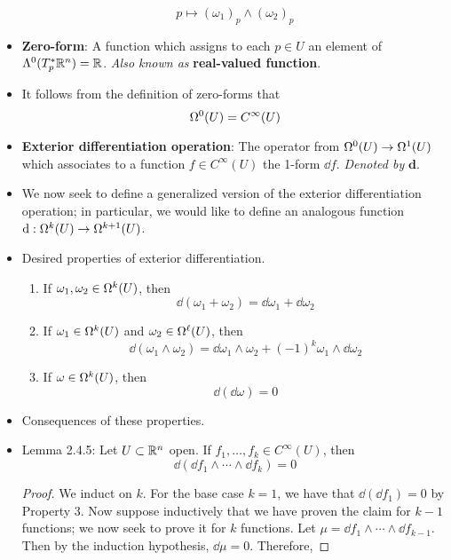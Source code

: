 \documentclass[../notes.tex]{subfiles}
\begin{document}
\begin{itemize}
\begin{equation*}
        p \mapsto (\omega_1)_p\wedge(\omega_2)_p
    \end{equation*}
    \item \textbf{Zero-form}: A function which assigns to each $p\in U$ an element of $\lam[0]{T_p^*\R^n}=\R$. \emph{Also known as} \textbf{real-valued function}.
    \item It follows from the definition of zero-forms that
    \begin{equation*}
        \ome[0]{U} = C^\infty(U)
    \end{equation*}
    \item \textbf{Exterior differentiation operation}: The operator from $\ome[0]{U}\to\ome[1]{U}$ which associates to a function $f\in C^\infty(U)$ the 1-form $\dd f$. \emph{Denoted by} $\mathbf{d}$.
    \item We now seek to define a generalized version of the exterior differentiation operation; in particular, we would like to define an analogous function $\dd:\ome[k]{U}\to\ome[k+1]{U}$.
    \item Desired properties of exterior differentiation.
    \begin{enumerate}
        \item If $\omega_1,\omega_2\in\ome[k]{U}$, then
        \begin{equation*}
            \dd(\omega_1+\omega_2) = \dd\omega_1+\dd\omega_2
        \end{equation*}
        \item If $\omega_1\in\ome[k]{U}$ and $\omega_2\in\ome[\ell]{U}$, then
        \begin{equation*}
            \dd(\omega_1\wedge\omega_2) = \dd\omega_1\wedge\omega_2+(-1)^k\omega_1\wedge\dd\omega_2
        \end{equation*}
        \item If $\omega\in\ome[k]{U}$, then
        \begin{equation*}
            \dd(\dd\omega) = 0
        \end{equation*}
    \end{enumerate}
    \item Consequences of these properties.
    \item Lemma 2.4.5: Let $U\subset\R^n$ open. If $f_1,\dots,f_k\in C^\infty(U)$, then
    \begin{equation*}
        \dd(\dd f_1\wedge\cdots\wedge\dd f_k) = 0
    \end{equation*}
    \begin{proof}
        We induct on $k$. For the base case $k=1$, we have that $\dd(\dd f_1)=0$ by Property 3. Now suppose inductively that we have proven the claim for $k-1$ functions; we now seek to prove it for $k$ functions. Let $\mu=\dd f_1\wedge\cdots\wedge\dd f_{k-1}$. Then by the induction hypothesis, $\dd\mu=0$. Therefore,

\end{proof}
\end{itemize}
\end{document}
